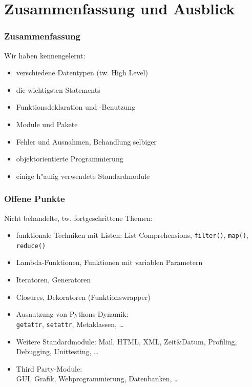 \section{Zusammenfassung und Ausblick}

\begin{frame}
\frametitle{Zusammenfassung}
Wir haben kennengelernt:
\begin{itemize}
\item verschiedene Datentypen (tw. \glqq High Level\grqq)
\item die wichtigsten Statements
\item Funktionsdeklaration und -Benutzung
\item Module und Pakete
\item Fehler und Ausnahmen, Behandlung selbiger
\item objektorientierte Programmierung
\item einige h"aufig verwendete Standardmodule
\end{itemize}
\end{frame}

\begin{frame}
\frametitle{Offene Punkte}
Nicht behandelte, tw. fortgeschrittene Themen:
\begin{itemize}
\item funktionale Techniken mit Listen: List Comprehensions, \texttt{filter()}, \texttt{map()}, \texttt{reduce()}
\item Lambda-Funktionen, Funktionen mit variablen Parametern
\item Iteratoren, Generatoren
\item Closures, Dekoratoren (Funktionswrapper)
\item Ausnutzung von Pythons Dynamik:\\\texttt{getattr}, \texttt{setattr}, Metaklassen, \dots
\item Weitere Standardmodule: Mail, HTML, XML, Zeit\&Datum, Profiling, Debugging, Unittesting, \dots
\item Third Party-Module:\\GUI, Grafik, Webprogrammierung, Datenbanken, \dots
\end{itemize}
\end{frame}

